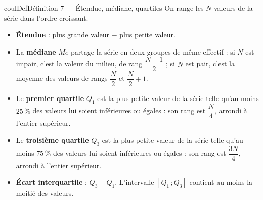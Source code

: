 \documentclass[11pt,a4paper]{article}
\makeatletter
\newcommand{\lycee@intff}[2]{\left[#1\,;#2\right]}
\providecommand{\intff}{\lycee@intff}%
\newcounter{lycee@signet}
\newcommand{\signet}[3][]{\stepcounter{lycee@signet}%
  \edef\lycee@dest{\if\relax\detokenize{#1}\relax
    signet.\arabic{lycee@signet}\else#1\fi}%
  \hypertarget{\lycee@dest}{}\bookmark[level=#2,dest=\lycee@dest]{#3}}
\newenvironment{definitionbox}[1][Définition]%
  {\begin{boitecours}[phantom={\signet{2}{#1}}]{coulDef}{#1}}{\end{boitecours}}
\makeatother
\begin{document}
\begin{definitionbox}[Définition 7 --- Étendue, médiane, quartiles]
On range les $N$ valeurs de la série dans l'ordre croissant.
\begin{itemize}
  \item \textbf{Étendue} : plus grande valeur $-$ plus petite valeur.
  \item La \textbf{médiane} $Me$ partage la série en deux groupes de même effectif :
    si $N$ est impair, c'est la valeur du milieu, de rang $\dfrac{N+1}{2}$ ; si $N$ est
    pair, c'est la moyenne des valeurs de rangs $\dfrac{N}{2}$ et $\dfrac{N}{2}+1$.
  \item Le \textbf{premier quartile} $Q_1$ est la plus petite valeur de la série telle
    qu'au moins $25\,\%$ des valeurs lui soient inférieures ou égales : son rang est
    $\dfrac{N}{4}$, arrondi à l'entier supérieur.
  \item Le \textbf{troisième quartile} $Q_3$ est la plus petite valeur de la série
    telle qu'au moins $75\,\%$ des valeurs lui soient inférieures ou égales : son rang
    est $\dfrac{3N}{4}$, arrondi à l'entier supérieur.
  \item \textbf{Écart interquartile} : $Q_3-Q_1$. L'intervalle $\intff{Q_1}{Q_3}$
    contient au moins la moitié des valeurs.
\end{itemize}
\end{definitionbox}
\end{document}
